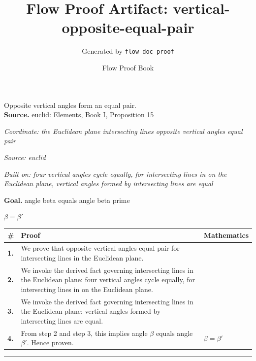 \documentclass[11pt]{article}
\title{Flow Proof Artifact: vertical-opposite-equal-pair}
\author{Generated by \texttt{flow doc proof}}
\date{Flow Proof Book}
\theoremstyle{definition}
\begin{document}
\maketitle
Opposite vertical angles form an equal pair.\\[0.5em]
\textbf{Source.} euclid: Elements, Book I, Proposition 15\\[0.5em]
\bigskip
{}\par
\smallskip\noindent\textit{Coordinate: the Euclidean plane \cdot intersecting lines \cdot opposite vertical angles equal pair}\par
\smallskip\noindent\textit{Source: euclid}\par
\smallskip\noindent\textit{Built on: four vertical angles cycle equally, for intersecting lines in on the Euclidean plane, vertical angles formed by intersecting lines are equal}\par
\medskip
\noindent\textbf{Goal.} angle beta equals angle beta prime\par
\noindent$\displaystyle \beta = \beta'$\par
\medskip
\noindent
\begin{tabular}{@{} >{\raggedright\arraybackslash}p{} >{\raggedright\arraybackslash}p{} >{\raggedleft\arraybackslash}p{} @{}}
\textbf{\#} & \textbf{Proof} & \textbf{Mathematics} \\
\midrule
\textbf{1.} & We prove that opposite vertical angles equal pair for intersecting lines in the Euclidean plane. & \\[0.45em]
\textbf{2.} & We invoke the derived fact governing intersecting lines in the Euclidean plane: four vertical angles cycle equally, for intersecting lines in on the Euclidean plane. & \\[0.45em]
\textbf{3.} & We invoke the derived fact governing intersecting lines in the Euclidean plane: vertical angles formed by intersecting lines are equal. & \\[0.45em]
\textbf{4.} & From step 2 and step 3, this implies angle $\beta$ equals angle $\beta$$'$. Hence proven. & $\displaystyle \beta = \beta'$ \\[0.45em]
\bottomrule
\end{tabular}
\label{thm:Geometry-intersecting lines-opposite_vertical_angles_equal_pair}
\par\medskip\hrule
\end{document}
